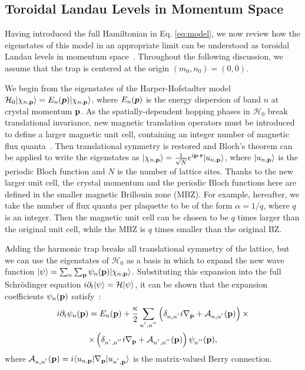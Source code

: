 \subsection{Toroidal Landau Levels in Momentum Space}\label{sec:eigenstates}

Having introduced the full Hamiltonian  in Eq. \eqref{eq:model}, we now review how the eigenstates of this model in an appropriate limit can be understood as toroidal Landau levels in momentum space~\cite{price2014magnetic}. Throughout the following discussion, we assume that the trap is centered at the origin $(m_0, n_0)= (0,0)$.  

We begin from the eigenstates of the Harper-Hofstadter model $\mathcal{H}_0\vert \chi_{n,\mathbf{p}} \rangle = E_n (\bm{p}) \vert \chi_{n,\mathbf{p}} \rangle$, where $E_n (\bm{p}) $ is the energy dispersion of band $n$ at crystal momentum $\mathbf{p}$. As the spatially-dependent hopping phases in $\mathcal{H}_0$ break translational invariance, new magnetic translation operators must be introduced to define a larger magnetic unit cell, containing an integer number of magnetic flux quanta~\cite{zak1964group, zak1964representations, 1chang}. Then translational symmetry is restored and Bloch's theorem can be applied to write the eigenstates as $\vert \chi_{n,\mathbf{p}} \rangle = \frac{1}{\sqrt{N}} e^{i\mathbf{p}\cdot \mathbf{r}} \vert u_{n,\mathbf{p}} \rangle$, where $\vert u_{n,\mathbf{p}} \rangle$ is the periodic Bloch function and $N$ is the number of lattice sites. Thanks to the new larger unit cell, the crystal momentum and the periodic Bloch functions here are defined in the smaller magnetic Brillouin zone (MBZ). For example, hereafter, we take the number of flux quanta per plaquette to be of the form $\alpha=1/q$, where $q$ is an integer. Then the magnetic unit cell can be chosen to be $q$ times larger than the original unit cell, while the MBZ is $q$ times smaller than the original BZ.

Adding the harmonic trap breaks all translational symmetry of the lattice, but we can use the eigenstates of $\mathcal{H}_0$ as a basis in which to expand the new wave function 
$\vert \psi \rangle = \sum_n\sum_{\mathbf{p}} \psi_n(\mathbf{p})
\vert \chi_{n,\mathbf{p}} \rangle$. Substituting this expansion into the full Schr\"{o}dinger equation
$i \partial_t \vert \psi \rangle = \mathcal{H} \vert \psi \rangle$, it can be shown that the expansion coefficients $\psi_n(\mathbf{p})$ satisfy~\cite{price2014magnetic}:
%
\begin{multline} 
  i \partial_t \psi_n(\mathbf{p}) = E_n(\mathbf{p}) + \frac{\kappa}{2}\sum_{n^{'},n^{''}}\left(\delta_{n,n^{'}}i \nabla_{\mathbf{p}} + \mathcal{A}_{n,n^{'}}(\mathbf{p})\right)\times \\ \times \left(\delta_{n^{'},n^{''}}i\nabla_{\mathbf{p}} + \mathcal{A}_{n^{'},n^{''}}(\mathbf{p})\right) \psi_{n^{''}}(\mathbf{p}) ,  \label{eq:first}
\end{multline}
where $\mathcal{A}_{n,n^{'}}(\mathbf{p}) = i\langle u_{n,\mathbf{p}} \vert\nabla_{\mathbf{p}}\vert u_{n^{'},\mathbf{p}} \rangle$ is the matrix-valued Berry connection. 

